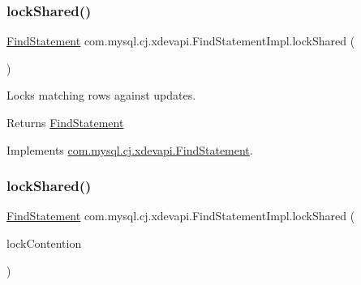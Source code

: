 \mbox{\label{classcom_1_1mysql_1_1cj_1_1xdevapi_1_1_find_statement_impl_acdc867ddce32e3776d059f72a601fbdd}} 
\subsubsection{\texorpdfstring{lock\+Shared()}{lockShared()}\hspace{0.1cm}{\footnotesize\ttfamily [1/2]}}
{\footnotesize\ttfamily \mbox{\hyperlink{interfacecom_1_1mysql_1_1cj_1_1xdevapi_1_1_find_statement}{Find\+Statement}} com.\+mysql.\+cj.\+xdevapi.\+Find\+Statement\+Impl.\+lock\+Shared (\begin{DoxyParamCaption}{ }\end{DoxyParamCaption})}

Locks matching rows against updates.

\begin{DoxyReturn}{Returns}
\mbox{\hyperlink{interfacecom_1_1mysql_1_1cj_1_1xdevapi_1_1_find_statement}{Find\+Statement}} 
\end{DoxyReturn}


Implements \mbox{\hyperlink{interfacecom_1_1mysql_1_1cj_1_1xdevapi_1_1_find_statement_aaa2bf84ac564387d2909bf201aa57fc1}{com.\+mysql.\+cj.\+xdevapi.\+Find\+Statement}}.

\mbox{\label{classcom_1_1mysql_1_1cj_1_1xdevapi_1_1_find_statement_impl_aecf5ef40361b9b8646b416543c82d2d4}} 
\subsubsection{\texorpdfstring{lock\+Shared()}{lockShared()}\hspace{0.1cm}{\footnotesize\ttfamily [2/2]}}
{\footnotesize\ttfamily \mbox{\hyperlink{interfacecom_1_1mysql_1_1cj_1_1xdevapi_1_1_find_statement}{Find\+Statement}} com.\+mysql.\+cj.\+xdevapi.\+Find\+Statement\+Impl.\+lock\+Shared (\begin{DoxyParamCaption}\item[{Lock\+Contention}]{lock\+Contention }\end{DoxyParamCaption})}


